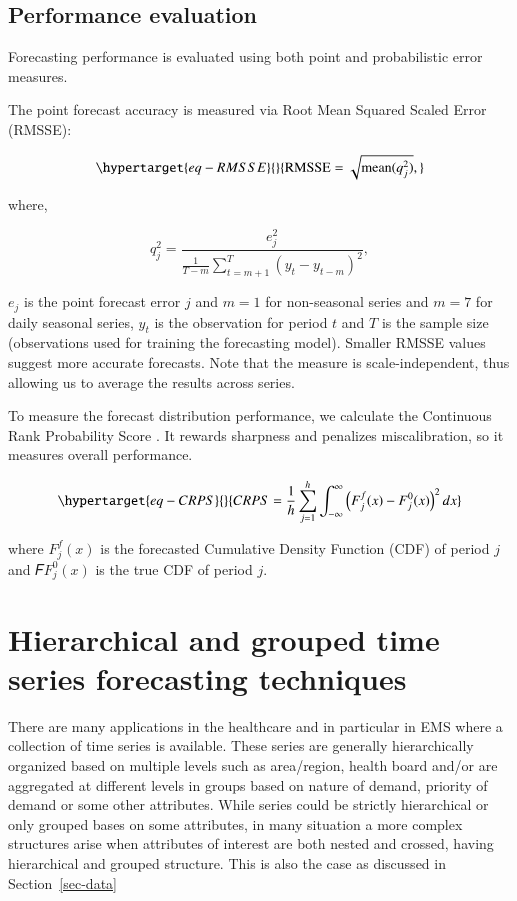 \documentclass[
  authoryear,
  preprint,
  3p]{elsarticle}
\begin{document}
\hypertarget{performance-evaluation}{%
\subsection{Performance evaluation}\label{performance-evaluation}}

Forecasting performance is evaluated using both point and probabilistic
error measures.

The point forecast accuracy is measured via Root Mean Squared Scaled
Error (RMSSE):

\begin{equation}\protect\hypertarget{eq-RMSSE}{}{
\text{RMSSE} = \sqrt{\text{mean}(q_{j}^2)},
}\label{eq-RMSSE}\end{equation}

where,

\[
q^2_{j} = \frac{\displaystyle e^2_{j}}
    {\displaystyle\frac{1}{T-m}\sum_{t=m+1}^T (y_{t}-y_{t-m})^2},
\]

\(e_{j}\) is the point forecast error \(j\) and \(m = 1\) for
non-seasonal series and \(m = 7\) for daily seasonal series, \(y_t\) is
the observation for period \(t\) and \(T\) is the sample size
(observations used for training the forecasting model). Smaller RMSSE
values suggest more accurate forecasts. Note that the measure is
scale-independent, thus allowing us to average the results across
series.

To measure the forecast distribution performance, we calculate the
Continuous Rank Probability Score \citep{gneiting2014probabilistic}. It
rewards sharpness and penalizes miscalibration, so it measures overall
performance.

\begin{equation}\protect\hypertarget{eq-CRPS}{}{
CRPS=\frac{1}{h} \sum_{j=1}^{h} \int_{-\infty}^{\infty} \left(F^f_j(x) - F^0_j(x)\right)^2dx
}\label{eq-CRPS}\end{equation}

where \(F^f_j(x)\) is the forecasted Cumulative Density Function (CDF)
of period \(j\) and 𝐹\(F^0_j(x)\) is the true CDF of period \(j\).

\hypertarget{sec-htc}{%
\section{Hierarchical and grouped time series forecasting
techniques}\label{sec-htc}}

There are many applications in the healthcare and in particular in EMS
where a collection of time series is available. These series are
generally hierarchically organized based on multiple levels such as
area/region, health board and/or are aggregated at different levels in
groups based on nature of demand, priority of demand or some other
attributes. While series could be strictly hierarchical or only grouped
bases on some attributes, in many situation a more complex structures
arise when attributes of interest are both nested and crossed, having
hierarchical and grouped structure. This is also the case as discussed
in Section~\ref{sec-data}
\end{document}
